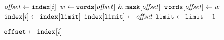     \item[]
       \label{line:intersect:1}
       \label{line:intersect:2}
      \STATE $\mathit{offset} \leftarrow \texttt{index}[i]$ \label{line:intersect:3}
      \STATE $w \leftarrow \Words[\localvar{offset}] \ \& \ \Mask[\localvar{offset}]$  \label{line:intersect:4}
       \label{line:intersect:5}
      \STATE $\texttt{words}[\mathit{offset}] \leftarrow w$ \label{line:intersect:6}
       \label{line:intersect:7}
      \STATE $\texttt{index}[i] \leftarrow \texttt{index}[\texttt{limit}]$ \label{line:intersect:8}
      \STATE $\texttt{index}[\texttt{limit}] \leftarrow \mathit{offset}$ \label{line:intersect:8.5}
      \STATE $\texttt{limit} \leftarrow \texttt{limit} - 1$ \label{line:intersect:9}
      \ENDIF
      \ENDIF
      \ENDFOR
      \Endfunc

    \item[]
       \label{line:interIdx:1}
       \label{line:interIdx:2}
      \STATE $\texttt{offset} \leftarrow \texttt{index}[i]$ \label{line:interIdx:4}
       \label{line:interIdx:5}
      \RETURN{$\Offset$} \label{line:interIdx:6}
      \ENDIF
      \ENDFOR
       \label{line:interIdx:7}
      \Endfunc


